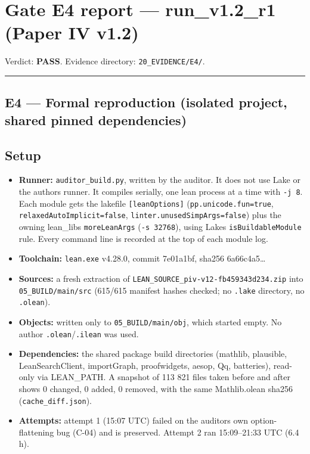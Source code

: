 \documentclass[
]{article}
\author{}
\date{}
\providecommand{\tightlist}{%
  \setlength{\itemsep}{0pt}\setlength{\parskip}{0pt}}
\begin{document}
\section{Gate E4 report --- run\_v1.2\_r1 (Paper IV
v1.2)}\label{gate-e4-report--run_v12_r1-paper-iv-v12}

Verdict: \textbf{PASS}. Evidence directory: \texttt{20\_EVIDENCE/E4/}.

\begin{center}\rule{0.5\linewidth}{0.5pt}\end{center}

\subsection{E4 --- Formal reproduction (isolated project, shared pinned
dependencies)}\label{e4--formal-reproduction-isolated-project-shared-pinned-dependencies}

\subsection{Setup}\label{setup}

\begin{itemize}
\tightlist
\item
  \textbf{Runner:} \texttt{auditor\_build.py}, written by the auditor.
  It does not use Lake or the author\textquotesingle s runner. It
  compiles serially, one lean process at a time with \texttt{-j\ 8}.
  Each module gets the lakefile \texttt{{[}leanOptions{]}}
  (\texttt{pp.unicode.fun=true}, \texttt{relaxedAutoImplicit=false},
  \texttt{linter.unusedSimpArgs=false}) plus the owning
  lean\_lib\textquotesingle s \texttt{moreLeanArgs}
  (\texttt{-s\ 32768}), using Lake\textquotesingle s
  \texttt{isBuildableModule} rule. Every command line is recorded at the
  top of each module log.
\item
  \textbf{Toolchain:} \texttt{lean.exe} v4.28.0, commit 7e01a1bf, sha256
  6a66c4a5\ldots{}
\item
  \textbf{Sources:} a fresh extraction of
  \texttt{LEAN\_SOURCE\_piv-v12-fb459343d234.zip} into
  \texttt{05\_BUILD/main/src} (615/615 manifest hashes checked; no
  \texttt{.lake} directory, no \texttt{.olean}).
\item
  \textbf{Objects:} written only to \texttt{05\_BUILD/main/obj}, which
  started empty. No author \texttt{.olean}/\texttt{.ilean} was used.
\item
  \textbf{Dependencies:} the shared package build directories (mathlib,
  plausible, LeanSearchClient, importGraph, proofwidgets, aesop, Qq,
  batteries), read-only via LEAN\_PATH. A snapshot of 113 821 files
  taken before and after shows 0 changed, 0 added, 0 removed, with the
  same Mathlib.olean sha256 (\texttt{cache\_diff.json}).
\item
  \textbf{Attempts:} attempt 1 (15:07 UTC) failed on the
  auditor\textquotesingle s own option-flattening bug (C-04) and is
  preserved. Attempt 2 ran 15:09--21:33 UTC (6.4 h).
\end{itemize}
\end{document}
